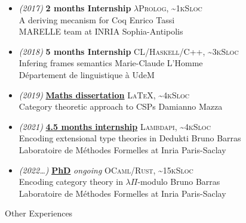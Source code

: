 \documentclass[a4paper,11pt]{extarticle}
\newcommand{\cvtitle}[1]{
    \begin{tcolorbox}[colback=sidebg,colframe=sidefg,coltext=sidetext,
        height=1cm, valign=center, sharp corners=downhill]
        {\Large #1}
    \end{tcolorbox}
}
\newcommand{\lang}[2]{\hfill \textsc{\scriptsize #1, \textasciitilde#2Sloc}}
\newcommand{\director}[1]{\hfill {\scriptsize #1}}
\begin{document}
\begin{minipage}[c][282mm][t]{0.60\linewidth}
{        \begin{itemize}
          \item \emph{\small (2017)} \textbf{2 months Internship}
                \lang{$\lambda$Prolog}{1k}\\
                A deriving mecanism for Coq
                \director{Enrico Tassi} \\
                MARELLE team at INRIA Sophia-Antipolis
          \item \emph{\small (2018)} \textbf{5 months Internship}
                \lang{CL/Haskell/C++}{3k}\\
                Infering frames semantics
                \director{Marie-Claude L'Homme}\\
                Département de linguistique à UdeM
          \item \emph{\small (2019)} \textbf{\href{https://github.com/dwarfmaster/memoire-dma-l3}{Maths dissertation}}
                \lang{\LaTeX}{4k}\\
                Category theoretic approach to CSPs
                \director{Damianno Mazza}
          \item \emph{\small (2021)} \textbf{\href{https://github.com/dwarfmaster/ett-in-lambdapi}{4.5 months internship}}
                \lang{Lambdapi}{4k}\\
                Encoding extensional type theories in Dedukti
                \director{Bruno Barras} \\
                Laboratoire de Méthodes Formelles at Inria Paris-Saclay
          \item \emph{\small (2022\dots)} \textbf{\href{https://github.com/dwarfmaster/commutative-diagrams}{PhD}} \emph{ongoing}
                \lang{OCaml/Rust}{15k} \\
                Encoding category theory in $\lambda\Pi$-modulo
                \director{Bruno Barras} \\
                Laboratoire de Méthodes Formelles at Inria Paris-Saclay
        \end{itemize}

        \cvtitle{Other Experiences}

}
\end{minipage}
\end{document}
